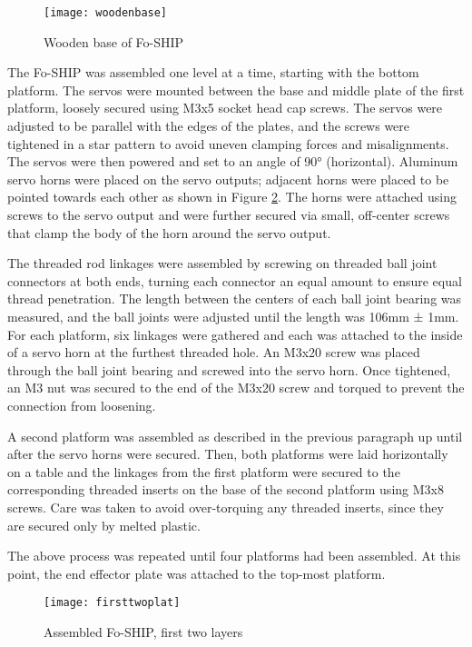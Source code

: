 \documentclass[11pt]{ucthesisCP}
\begin{document}
\begin{figure}[htbp]
	\centering
	\texttt{[image: woodenbase]}
	\caption{Wooden base of Fo-SHIP}
	\label{fig:woodenbase}
\end{figure}

The Fo-SHIP was assembled one level at a time, starting with the bottom platform. The servos were mounted between the base and middle plate of the first platform, loosely secured using M3x5 socket head cap screws. The servos were adjusted to be parallel with the edges of the plates, and the screws were tightened in a star pattern to avoid uneven clamping forces and misalignments. The servos were then powered and set to an angle of 90° (horizontal). Aluminum servo horns were placed on the servo outputs; adjacent horns were placed to be pointed towards each other as shown in Figure \ref{fig:firsttwoplat}. The horns were attached using screws to the servo output and were further secured via small, off-center screws that clamp the body of the horn around the servo output.

The threaded rod linkages were assembled by screwing on threaded ball joint connectors at both ends, turning each connector an equal amount to ensure equal thread penetration. The length between the centers of each ball joint bearing was measured, and the ball joints were adjusted until the length was 106mm ± 1mm. For each platform, six linkages were gathered and each was attached to the inside of a servo horn at the furthest threaded hole. An M3x20 screw was placed through the ball joint bearing and screwed into the servo horn. Once tightened, an M3 nut was secured to the end of the M3x20 screw and torqued to prevent the connection from loosening.

A second platform was assembled as described in the previous paragraph up until after the servo horns were secured. Then, both platforms were laid horizontally on a table and the linkages from the first platform were secured to the corresponding threaded inserts on the base of the second platform using M3x8 screws. Care was taken to avoid over-torquing any threaded inserts, since they are secured only by melted plastic. 

The above process was repeated until four platforms had been assembled. At this point, the end effector plate was attached to the top-most platform.

\begin{figure}[htbp]
	\centering
	\texttt{[image: firsttwoplat]}
	\caption{Assembled Fo-SHIP, first two layers}
	\label{fig:firsttwoplat}
\end{figure}
\end{document}
